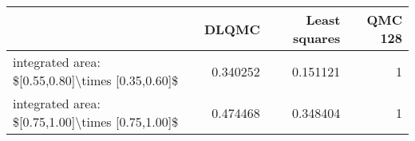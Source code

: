 \begin{tabular}{lrrr}
\toprule
                                                  &    DLQMC &   Least squares &   QMC 128 \\
\midrule
 integrated area: \$[0.55,0.80]\textbackslash{}times [0.35,0.60]\$ & 0.340252 &        0.151121 &         1 \\
 integrated area: \$[0.75,1.00]\textbackslash{}times [0.75,1.00]\$ & 0.474468 &        0.348404 &         1 \\
\bottomrule
\end{tabular}
